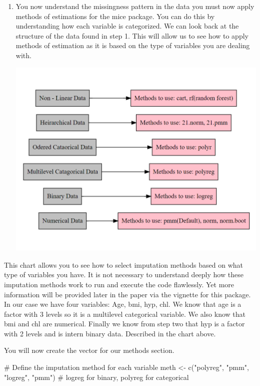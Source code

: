 \documentclass[
  letterpaper,
  DIV=11,
  numbers=noendperiod]{scrreprt}
\newenvironment{Shaded}{\begin{snugshade}}{\end{snugshade}}
\newcommand{\CommentTok}[1]{\textcolor[rgb]{0.37,0.37,0.37}{#1}}
\newcommand{\FunctionTok}[1]{\textcolor[rgb]{0.28,0.35,0.67}{#1}}
\newcommand{\NormalTok}[1]{\textcolor[rgb]{0.00,0.23,0.31}{#1}}
\newcommand{\OtherTok}[1]{\textcolor[rgb]{0.00,0.23,0.31}{#1}}
\newcommand{\StringTok}[1]{\textcolor[rgb]{0.13,0.47,0.30}{#1}}
\begin{document}
\begin{enumerate}
\def\labelenumi{\arabic{enumi}.}
\setcounter{enumi}{2}
\item
  You now understand the missingness pattern in the data you must now
  apply methods of estimations for the mice package. You can do this by
  understanding how each variable is categorized. We can look back at
  the structure of the data found in step 1. This will allow us to see
  how to apply methods of estimation as it is based on the type of
  variables you are dealing with.

  \includegraphics{flow chart.png}
\end{enumerate}

This chart allows you to see how to select imputation methods based on
what type of variables you have. It is not necessary to understand
deeply how these imputation methods work to run and execute the code
flawlessly. Yet more information will be provided later in the paper via
the vignette for this package. In our case we have four variables: Age,
bmi, hyp, chl. We know that age is a factor with 3 levels so it is a
multilevel categorical variable. We also know that bmi and chl are
numerical. Finally we know from step two that hyp is a factor with 2
levels and is intern binary data. Described in the chart above.

You will now create the vector for our methods section.

\begin{Shaded}
\begin{Highlighting}[]
\CommentTok{\# Define the imputation method for each variable}
\NormalTok{meth }\OtherTok{\textless{}{-}} \FunctionTok{c}\NormalTok{(}\StringTok{"polyreg"}\NormalTok{, }\StringTok{"pmm"}\NormalTok{, }\StringTok{"logreg"}\NormalTok{, }\StringTok{"pmm"}\NormalTok{)  }\CommentTok{\# logreg for binary, polyreg for categorical}
\end{Highlighting}
\end{Shaded}
\end{document}

